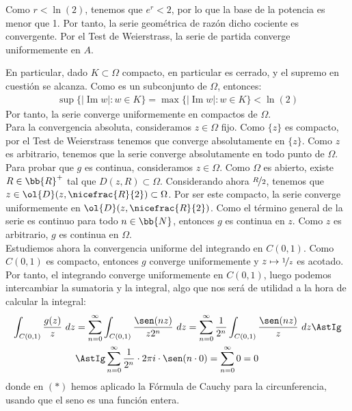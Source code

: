 \documentclass[12pt]{article}
\renewcommand{\Im}{\operatorname{Im}}
\begin{document}
\begin{ejercicio}[4 puntos]
\begin{description}
            Como $r<\ln(2)$, tenemos que $e^{r}<2$, por lo que la base de la potencia es menor que 1. Por tanto, la serie geométrica de razón dicho cociente es convergente. Por el Test de Weierstrass, la serie de partida converge uniformemente en $A$.
        \end{description}

        En particular, dado $K\subset \Omega$ compacto, en particular es cerrado, y el supremo en cuestión se alcanza. Como es un subconjunto de $\Omega$, entonces:
        \begin{align*}
            \sup\{|\Im w| : w\in K\}=\max\{|\Im w| : w\in K\} < \ln(2)
        \end{align*}
        Por tanto, la serie converge uniformemente en compactos de $\Omega$.\\

        Para la convergencia absoluta, consideramos $z\in \Omega$ fijo. Como $\{z\}$ es compacto, por el Test de Weierstrass tenemos que converge absolutamente en $\{z\}$. Como $z$ es arbitrario, tenemos que la serie converge absolutamente en todo punto de $\Omega$.\\

        Para probar que $g$ es continua, consideramos $z\in \Omega$. Como $\Omega$ es abierto, existe $R\in \bb{R}^+$ tal que $D(z,R)\subset \Omega$. Considerando ahora $\nicefrac{R}{2}$, tenemos que $z\in \ol{D}(z,\nicefrac{R}{2})\subset \Omega$. Por ser este compacto, la serie converge uniformemente en $\ol{D}(z,\nicefrac{R}{2})$. Como el término general de la serie es continuo para todo $n\in \bb{N}$, entonces $g$ es continua en $z$. Como $z$ es arbitrario, $g$ es continua en $\Omega$.\\

        Estudiemos ahora la convergencia uniforme del integrando en $C(0,1)$. Como $C(0,1)$ es compacto, entonces $g$ converge uniformemente y $z\mapsto \nicefrac{1}{z}$ es acotado. Por tanto, el integrando converge uniformemente en $C(0,1)$, luego podemos intercambiar la sumatoria y la integral, algo que nos será de utilidad a la hora de calcular la integral:
        \begin{align*}
            \int_{C(0,1)} \frac{g(z)}{z}\ dz &= \sum_{n=0}^{\infty} \int_{C(0,1)} \frac{\sen(nz)}{z2^n}\ dz
            = \sum_{n=0}^{\infty} \frac{1}{2^n}\int_{C(0,1)} \frac{\sen(nz)}{z}\ dz \AstIg\\&\AstIg \sum_{n=0}^{\infty} \frac{1}{2^n}\cdot 2\pi i \cdot \sen (n\cdot 0) = \sum_{n=0}^{\infty} 0 = 0
        \end{align*}
        donde en $(\ast)$ hemos aplicado la Fórmula de Cauchy para la circunferencia, usando que el seno es una función entera.
    \end{ejercicio}
\end{document}
